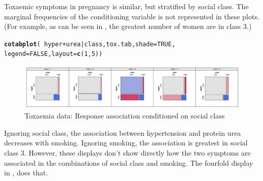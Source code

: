 \documentclass[11pt]{book}\usepackage[]{graphicx}\usepackage[]{color}
\makeatletter
\newcommand{\hlnum}[1]{\textcolor[rgb]{0.686,0.059,0.569}{#1}}%
\newcommand{\hlopt}[1]{\textcolor[rgb]{0,0,0}{#1}}%
\newcommand{\hlstd}[1]{\textcolor[rgb]{0.345,0.345,0.345}{#1}}%
\newcommand{\hlkwc}[1]{\textcolor[rgb]{0.333,0.667,0.333}{#1}}%
\newcommand{\hlkwd}[1]{\textcolor[rgb]{0.737,0.353,0.396}{\textbf{#1}}}%
\newenvironment{kframe}{%
 \def\at@end@of@kframe{}%
 \ifinner\ifhmode%
  \def\at@end@of@kframe{\end{minipage}}%
  \begin{minipage}{\columnwidth}%
 \fi\fi%
 \def\FrameCommand##1{\hskip\@totalleftmargin \hskip-\fboxsep
 \colorbox{shadecolor}{##1}\hskip-\fboxsep
     \hskip-\linewidth \hskip-\@totalleftmargin \hskip\columnwidth}%
 \MakeFramed {\advance\hsize-\width
   \@totalleftmargin\z@ \linewidth\hsize
   \@setminipage}}%
 {\par\unskip\endMakeFramed%
 \at@end@of@kframe}
\newenvironment{knitrout}{}{} %
\renewenvironment{knitrout}{\small\renewcommand{\baselinestretch}{.85}}{} %
\makeatother
\begin{document}
\begin{Example}[toxaemia]{Toxaemic symptoms in pregnancy}
\begin{knitrout}
\end{knitrout}
 is similar, but stratified by social class.
The marginal frequencies of the conditioning variable is not represented in these plots.
(For example, as can be seen in , the greatest number of women are in class 3.)

\begin{knitrout}
\color{fgcolor}\begin{kframe}
\begin{alltt}
\hlkwd{cotabplot}\hlstd{(}\hlopt{~}\hlstd{hyper} \hlopt{+} \hlstd{urea} \hlopt{|} \hlstd{class, tox.tab,} \hlkwc{shade}\hlstd{=}\hlnum{TRUE}\hlstd{,}
          \hlkwc{legend}\hlstd{=}\hlnum{FALSE}\hlstd{,} \hlkwc{layout}\hlstd{=}\hlkwd{c}\hlstd{(}\hlnum{1}\hlstd{,}\hlnum{5}\hlstd{))}
\end{alltt}
\end{kframe}\begin{figure}[!htbp]


\centerline{\includegraphics[width=1.1\textwidth]{ch08/fig/tox-mosaic3-1} }

\caption[Toxaemia data]{Toxaemia data: Response association conditioned on social class\label{fig:tox-mosaic3}}
\end{figure}


\end{knitrout}
Ignoring social class, the association between hypertension and protein urea
decreases with smoking.
Ignoring smoking, the association is greatest in social class 3.
However, these displays don't show directly how the two symptoms are
associated in the combinations of social class and smoking.
The fourfold display in , does that.


\end{Example}
\end{document}
